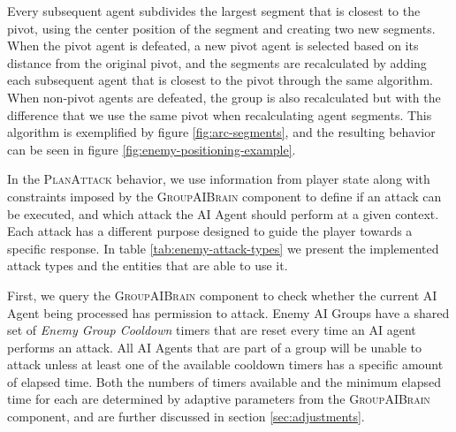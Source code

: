 Every subsequent agent subdivides the largest segment that is closest to the pivot, using the center position of the segment and creating two new segments. When the pivot agent is defeated, a new pivot agent is selected based on its distance from the original pivot, and the segments are recalculated by adding each subsequent agent that is closest to the pivot through the same algorithm. When non-pivot agents are defeated, the group is also recalculated but with the difference that we use the same pivot when recalculating agent segments. This algorithm is exemplified by figure \ref{fig:arc-segments}, and the resulting behavior can be seen in figure \ref{fig:enemy-positioning-example}.





In the \textsc{PlanAttack} behavior, we use information from player state along with constraints imposed by the \textsc{GroupAIBrain} component to define if an attack can be executed, and which attack the AI Agent should perform at a given context. Each attack has a different purpose designed to guide the player towards a specific response. In table \ref{tab:enemy-attack-types} we present the implemented attack types and the entities that are able to use it.


First, we query the \textsc{GroupAIBrain} component to check whether the current AI Agent being processed has permission to attack. Enemy AI Groups have a shared set of \emph{Enemy Group Cooldown} timers that are reset every time an AI agent performs an attack. All AI Agents that are part of a group will be unable to attack unless at least one of the available cooldown timers has a specific amount of elapsed time. Both the numbers of timers available and the minimum elapsed time for each are determined by adaptive parameters from the \textsc{GroupAIBrain} component, and are further discussed in section \ref{sec:adjustments}.

